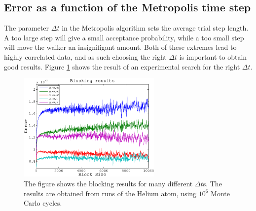 \documentclass[aps,prc,twocolumn,floatfix]{revtex4}
\begin{document}
\subsection{Error as a function of the Metropolis time step}
The parameter $\Delta t$ in the Metropolis algorithm sets the average trial step length. A too large step will give a small acceptance probability, while a too small step will move the walker an insignifigant amount. Both of these extremes lead to highly correlated data, and as such choosing the right $\Delta t$ is important to obtain good results. Figure \ref{fig:blockdt} shows the result of an experimental search for the right $\Delta t$. 

  \begin{figure}
\centering
\includegraphics[width=7cm]{figures/blockingdt.eps}
\caption{\label{fig:blockdt} The figure shows the blocking results for many different $\Delta t$s. The results are obtained from runs of the Helium atom, using $10^6$ Monte Carlo cycles.}
\end{figure}
\end{document}
